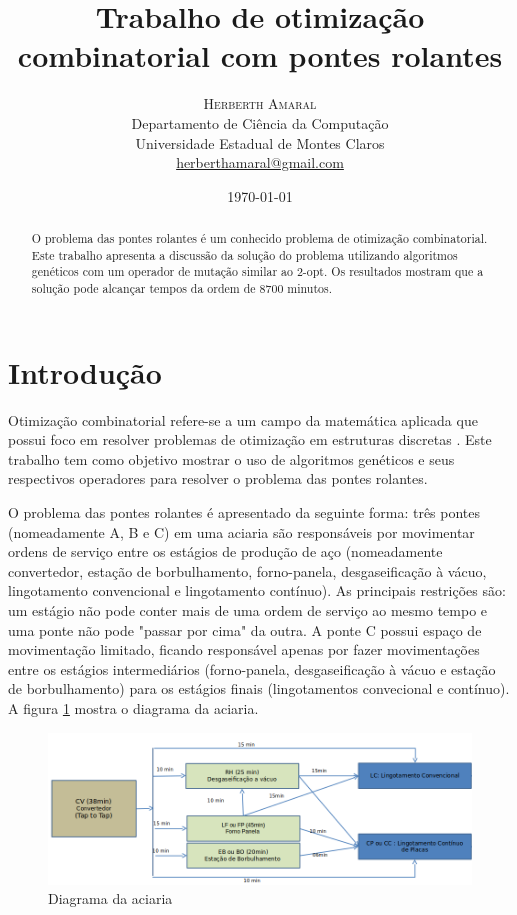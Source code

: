 \documentclass[11pt]{article}
\title{\vspace{.5cm}\fontsize{24pt}{10pt}\selectfont\textbf{\sc Trabalho de otimização combinatorial com pontes rolantes}} %
\author{
\large
\textsc{Herberth Amaral}\\[2mm]
\normalsize Departamento de Ciência da Computação \\
\normalsize Universidade Estadual de Montes Claros \\
\normalsize \href{mailto:herberthamaral@gmail.com}{herberthamaral@gmail.com}
\vspace{-5mm}
}
\date{\today}
\begin{document}
\maketitle %

\begin{abstract}
    O problema das pontes rolantes é um conhecido problema de otimização
    combinatorial. Este trabalho apresenta a discussão da solução do
    problema utilizando algoritmos genéticos com um operador de mutação similar
    ao 2-opt. Os resultados mostram que a solução pode alcançar tempos da ordem
    de 8700 minutos.
\end{abstract}

\thispagestyle{fancy} %

\newpage

\section{Introdução}
Otimização combinatorial refere-se a um campo da matemática aplicada que possui
foco em resolver problemas de otimização em estruturas discretas \cite{livro}.
Este trabalho tem como objetivo mostrar o uso de algoritmos genéticos e seus
respectivos operadores para resolver o problema das pontes rolantes.

O problema das pontes rolantes é apresentado da seguinte forma: três pontes
(nomeadamente A, B e C) em uma aciaria são responsáveis por movimentar ordens
de serviço entre os estágios de produção de aço (nomeadamente convertedor,
estação de borbulhamento, forno-panela, desgaseificação à vácuo, lingotamento
convencional e lingotamento contínuo). As principais restrições são: um estágio
não pode conter mais de uma ordem de serviço ao mesmo tempo e uma ponte não
pode "passar por cima" da outra. A ponte C possui espaço de movimentação
limitado, ficando responsável apenas por fazer movimentações entre os estágios
intermediários (forno-panela, desgaseificação à vácuo e estação de
borbulhamento) para os estágios finais (lingotamentos convecional e contínuo).
A figura \ref{fig:pontes} mostra o diagrama da aciaria.

\begin{figure}[H]
  \centering
  \includegraphics[width=1.0\textwidth]{pontes.png}
  \caption{Diagrama da aciaria}
  \label{fig:pontes}
\end{figure}
\end{document}
